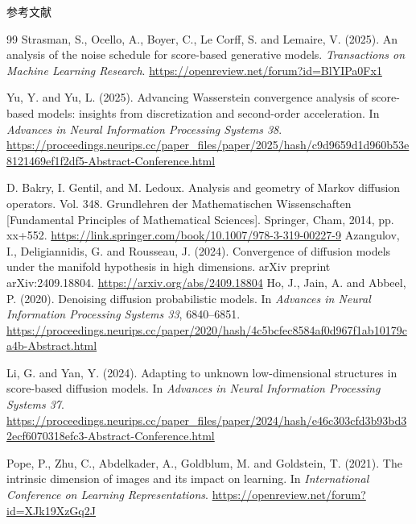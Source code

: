 \documentclass[11pt]{beamer}
\theoremstyle{plain}
\theoremstyle{definition}
\begin{document}
\begin{frame}[allowframebreaks]{参考文献}
\begin{thebibliography}{99}
    Strasman, S., Ocello, A., Boyer, C., Le Corff, S. and Lemaire, V. (2025).
    An analysis of the noise schedule for score-based generative models.
    \textit{Transactions on Machine Learning Research}.
    \url{https://openreview.net/forum?id=BlYIPa0Fx1}
    
    Yu, Y. and Yu, L. (2025).
    Advancing Wasserstein convergence analysis of score-based models:
    insights from discretization and second-order acceleration.
    In \textit{Advances in Neural Information Processing Systems 38}.
    \url{https://proceedings.neurips.cc/paper_files/paper/2025/hash/c9d9659d1d960b53e8121469ef1f2df5-Abstract-Conference.html}

    D. Bakry, I. Gentil, and M. Ledoux. Analysis and geometry of Markov diffusion operators. Vol. 348. Grundlehren der Mathematischen Wissenschaften [Fundamental Principles of Mathematical Sciences]. Springer, Cham, 2014, pp. xx+552.
    \url{https://link.springer.com/book/10.1007/978-3-319-00227-9}
    Azangulov, I., Deligiannidis, G. and Rousseau, J. (2024).
    Convergence of diffusion models under the manifold hypothesis
    in high dimensions.
    arXiv preprint arXiv:2409.18804.
    \url{https://arxiv.org/abs/2409.18804}
    Ho, J., Jain, A. and Abbeel, P. (2020).
    Denoising diffusion probabilistic models.
    In \textit{Advances in Neural Information Processing Systems 33},
    6840--6851.
    \url{https://proceedings.neurips.cc/paper/2020/hash/4c5bcfec8584af0d967f1ab10179ca4b-Abstract.html}

    Li, G. and Yan, Y. (2024).
    Adapting to unknown low-dimensional structures in
    score-based diffusion models.
    In \textit{Advances in Neural Information Processing Systems 37}.
    \url{https://proceedings.neurips.cc/paper_files/paper/2024/hash/e46c303cfd3b93bd32ecf6070318efc3-Abstract-Conference.html}

    Pope, P., Zhu, C., Abdelkader, A., Goldblum, M. and Goldstein, T. (2021).
    The intrinsic dimension of images and its impact on learning.
    In \textit{International Conference on Learning Representations}.
    \url{https://openreview.net/forum?id=XJk19XzGq2J}


\end{thebibliography}
\end{frame}
\end{document}
